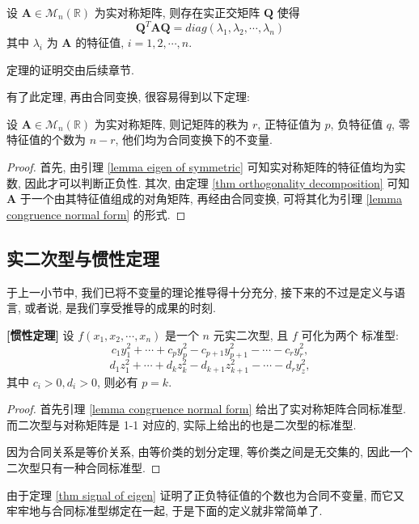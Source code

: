 \documentclass[UTF8]{book}
\begin{document}
\begin{theorem}\label{thm orthogonality decomposition}
    设 $\boldsymbol{A}\in \mathcal{M}_n(\mathbb{R})$ 为实对称矩阵, 
    则存在实正交矩阵 $\boldsymbol{Q}$ 使得 
    $$ \boldsymbol{Q}^T \boldsymbol{A}\boldsymbol{Q} = 
    diag(\lambda_1,\lambda_2,\cdots,\lambda_n)$$
    其中 $\lambda_i$ 为 $\boldsymbol{A}$ 的特征值, $i=1,2,\cdots,n$.
\end{theorem}

定理的证明交由后续章节. 

有了此定理, 再由合同变换, 很容易得到以下定理: 
\begin{theorem} \label{thm signal of eigen}
    设 $\boldsymbol{A}\in \mathcal{M}_n(\mathbb{R})$ 为实对称矩阵, 
    则记矩阵的秩为 $r$, 
    正特征值为 $p$, 负特征值 $q$, 零特征值的个数为 $n-r$, 
    他们均为合同变换下的不变量. 
\end{theorem}
\begin{proof}
    首先, 由引理 \ref{lemma eigen of symmetric} 可知实对称矩阵的特征值均为实数, 因此才可以判断正负性. 
    其次, 由定理 \ref{thm orthogonality decomposition} 
    可知 $\boldsymbol{A}$ 于一个由其特征值组成的对角矩阵, 
    再经由合同变换, 可将其化为引理 \ref{lemma congruence normal form} 的形式. 
\end{proof}

\subsection{实二次型与惯性定理}
于上一小节中, 我们已将不变量的理论推导得十分充分, 接下来的不过是定义与语言, 
或者说, 是我们享受推导的成果的时刻. 

\begin{theorem}
    \textbf{[惯性定理]} 
    设 $f(x_1,x_2,\cdots,x_n)$ 是一个 $n$ 元实二次型, 且 $f$ 可化为两个
    标准型: 
    $$ c_1y_1^2 +\cdots +c_py_p^2 - c_{p+1}y_{p+1}^2 - \cdots - c_ry_r^2,$$
    $$ d_1z_1^2 +\cdots +d_kz_k^2 - d_{k+1}z_{k+1}^2 - \cdots - d_ry_z^2,$$
    其中 $c_i>0,d_i>0$, 则必有 $p=k$. 
\end{theorem}

\begin{proof}
    首先引理 \ref{lemma congruence normal form} 给出了实对称矩阵合同标准型. 
    而二次型与对称矩阵是 1-1 对应的, 实际上给出的也是二次型的标准型.

    因为合同关系是等价关系, 由等价类的划分定理, 
    等价类之间是无交集的, 因此一个二次型只有一种合同标准型. 
\end{proof}

由于定理 \ref{thm signal of eigen} 证明了正负特征值的个数也为合同不变量, 
而它又牢牢地与合同标准型绑定在一起, 于是下面的定义就非常简单了. 
\end{document}
